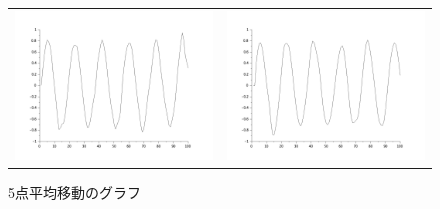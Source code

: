 \documentclass[a4paper,11pt]{jsarticle}
\begin{document}
    \begin{figure}[H]
      \begin{tabular}{cc}
        \begin{minipage}[t]{0.48\textwidth}
          \centering
          \includegraphics[clip,width=9cm]{picture/kenkyu1.png}
          \caption{3点平均移動のグラフ}
          \label{G:tanjun3}
        \end{minipage} &
        \begin{minipage}[t]{0.48\textwidth}
          \centering
          \includegraphics[clip,width=9cm]{picture/kenkyu2.png}
          \caption{5点平均移動のグラフ}
          \label{G:tanjun5}
        \end{minipage}
      \end{tabular}
    \end{figure}
\end{document}
